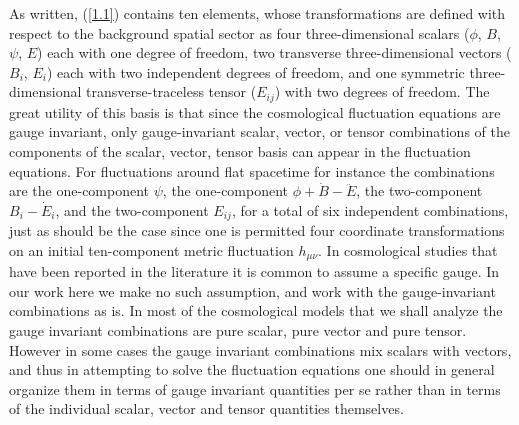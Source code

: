 \documentclass[aps,onecolumn,10pt]{revtex4}
\numberwithin{equation}{section}
\numberwithin{equation}{section}
\begin{document}
As written, (\ref{1.1}) contains ten elements, whose transformations are defined with respect to the background spatial sector as four three-dimensional scalars ($\phi$, $B$, $\psi$, $E$) each with one degree of freedom, two transverse three-dimensional vectors ($B_i$, $E_i$) each with two independent degrees of freedom, and one symmetric three-dimensional transverse-traceless tensor ($E_{ij}$) with two degrees of freedom. The great utility of this basis is that since the cosmological fluctuation equations are gauge invariant, only gauge-invariant scalar, vector, or tensor combinations of the components of the scalar, vector, tensor basis can appear in the fluctuation equations. For fluctuations around flat spacetime for instance the combinations are the one-component $\psi$, the one-component $\phi+\dot{B}  -\ddot{E}$, the two-component $B_{i} -  \dot{E}_{i}$, and the two-component $E_{ij}$, for a total of six independent combinations, just as should be the case since one is permitted four coordinate transformations on an initial ten-component metric fluctuation $h_{\mu\nu}$. In cosmological studies that have been reported in the literature it is common to assume a specific gauge. In our work here we make no such assumption, and work with the gauge-invariant combinations as is. In most of the cosmological models that we shall analyze the gauge invariant combinations are pure scalar, pure vector and pure tensor. However in some cases the gauge invariant combinations mix scalars with vectors, and thus in attempting to solve the fluctuation equations one should in general organize them in terms of gauge invariant quantities per se rather than in terms of the individual scalar, vector and tensor quantities themselves.
\end{document}
